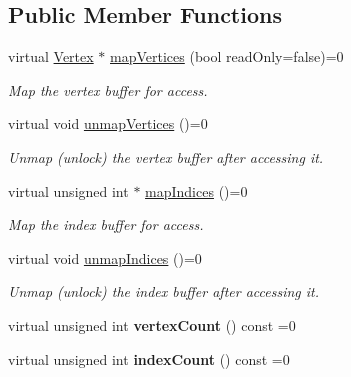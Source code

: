 \subsection*{Public Member Functions}
\begin{DoxyCompactItemize}
\item 
virtual \hyperlink{struct_lots_of_lines_1_1_vertex}{Vertex} $\ast$ \hyperlink{class_lots_of_lines_1_1_i_vertex_buffer_object_ae367bf3f773738ffb1bf6957dba1cc13}{map\+Vertices} (bool read\+Only=false)=0
\begin{DoxyCompactList}\small\item\em Map the vertex buffer for access. \end{DoxyCompactList}\item 
virtual void \hyperlink{class_lots_of_lines_1_1_i_vertex_buffer_object_afc26bc993026fa665f2514f07193468c}{unmap\+Vertices} ()=0\hypertarget{class_lots_of_lines_1_1_i_vertex_buffer_object_afc26bc993026fa665f2514f07193468c}{}\label{class_lots_of_lines_1_1_i_vertex_buffer_object_afc26bc993026fa665f2514f07193468c}

\begin{DoxyCompactList}\small\item\em Unmap (unlock) the vertex buffer after accessing it. \end{DoxyCompactList}\item 
virtual unsigned int $\ast$ \hyperlink{class_lots_of_lines_1_1_i_vertex_buffer_object_a8820943ddcb998bccb03a9769611218b}{map\+Indices} ()=0
\begin{DoxyCompactList}\small\item\em Map the index buffer for access. \end{DoxyCompactList}\item 
virtual void \hyperlink{class_lots_of_lines_1_1_i_vertex_buffer_object_ad9d74ca76d582e530150c93a95e71595}{unmap\+Indices} ()=0\hypertarget{class_lots_of_lines_1_1_i_vertex_buffer_object_ad9d74ca76d582e530150c93a95e71595}{}\label{class_lots_of_lines_1_1_i_vertex_buffer_object_ad9d74ca76d582e530150c93a95e71595}

\begin{DoxyCompactList}\small\item\em Unmap (unlock) the index buffer after accessing it. \end{DoxyCompactList}\item 
virtual unsigned int {\bfseries vertex\+Count} () const  =0\hypertarget{class_lots_of_lines_1_1_i_vertex_buffer_object_a3aaaf9b75c1d85be76ea9991bf258776}{}\label{class_lots_of_lines_1_1_i_vertex_buffer_object_a3aaaf9b75c1d85be76ea9991bf258776}

\item 
virtual unsigned int {\bfseries index\+Count} () const  =0\hypertarget{class_lots_of_lines_1_1_i_vertex_buffer_object_a565dc4ffbdd130359cc27465e1e52176}{}\label{class_lots_of_lines_1_1_i_vertex_buffer_object_a565dc4ffbdd130359cc27465e1e52176}

\end{DoxyCompactItemize}


